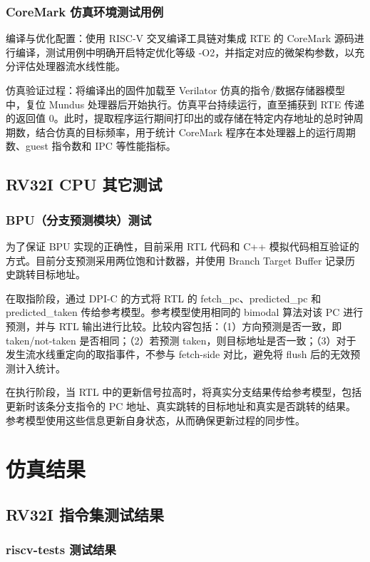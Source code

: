 \documentclass[UTF8,a4paper,zihao=-4]{ctexart}
\begin{document}
\subsubsection{CoreMark 仿真环境测试用例}

编译与优化配置：使用 RISC-V 交叉编译工具链对集成 RTE 的 CoreMark 源码进行编译，测试用例中明确开启特定优化等级 -O2，并指定对应的微架构参数，以充分评估处理器流水线性能。

仿真验证过程：将编译出的固件加载至 Verilator 仿真的指令/数据存储器模型中，复位 Mundus 处理器后开始执行。仿真平台持续运行，直至捕获到 RTE 传递的返回值 0。此时，提取程序运行期间打印出的或存储在特定内存地址的总时钟周期数，结合仿真的目标频率，用于统计 CoreMark 程序在本处理器上的运行周期数、guest 指令数和 IPC 等性能指标。

\subsection{RV32I CPU 其它测试}

\subsubsection{BPU（分支预测模块）测试}

为了保证 BPU 实现的正确性，目前采用 RTL 代码和 C++ 模拟代码相互验证的方式。目前分支预测采用两位饱和计数器，并使用 Branch Target Buffer 记录历史跳转目标地址。

在取指阶段，通过 DPI-C 的方式将 RTL 的 fetch\_pc、predicted\_pc 和 predicted\_taken 传给参考模型。参考模型使用相同的 bimodal 算法对该 PC 进行预测，并与 RTL 输出进行比较。比较内容包括：（1）方向预测是否一致，即 taken/not-taken 是否相同；（2）若预测 taken，则目标地址是否一致；（3）对于发生流水线重定向的取指事件，不参与 fetch-side 对比，避免将 flush 后的无效预测计入统计。

在执行阶段，当 RTL 中的更新信号拉高时，将真实分支结果传给参考模型，包括更新时该条分支指令的 PC 地址、真实跳转的目标地址和真实是否跳转的结果。参考模型使用这些信息更新自身状态，从而确保更新过程的同步性。

\section{仿真结果}

\subsection{RV32I 指令集测试结果}

\subsubsection{riscv-tests 测试结果}
\end{document}
